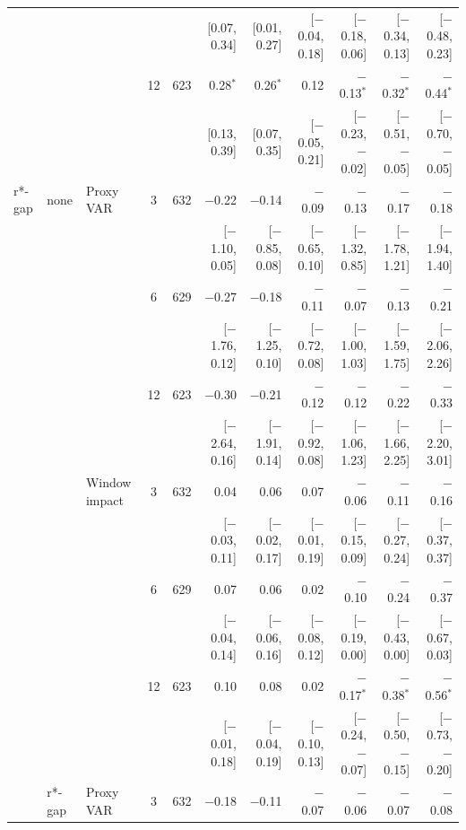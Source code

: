 \begin{longtable}{lllcrrrrrrr}
 & & & & & {\tiny [0.07, 0.34]} & {\tiny [0.01, 0.27]} & {\tiny [$-$0.04, 0.18]} & {\tiny [$-$0.18, 0.06]} & {\tiny [$-$0.34, 0.13]} & {\tiny [$-$0.48, 0.23]}\\
 &  &  & 12 & 623 & 0.28$^{*}$ & 0.26$^{*}$ & 0.12 & $-$0.13$^{*}$ & $-$0.32$^{*}$ & $-$0.44$^{*}$\\
 & & & & & {\tiny [0.13, 0.39]} & {\tiny [0.07, 0.35]} & {\tiny [$-$0.05, 0.21]} & {\tiny [$-$0.23, $-$0.02]} & {\tiny [$-$0.51, $-$0.05]} & {\tiny [$-$0.70, $-$0.05]}\\
\addlinespace
r*-gap & none & Proxy VAR & 3 & 632 & $-$0.22 & $-$0.14 & $-$0.09 & $-$0.13 & $-$0.17 & $-$0.18\\
 & & & & & {\tiny [$-$1.10, 0.05]} & {\tiny [$-$0.85, 0.08]} & {\tiny [$-$0.65, 0.10]} & {\tiny [$-$1.32, 0.85]} & {\tiny [$-$1.78, 1.21]} & {\tiny [$-$1.94, 1.40]}\\
 &  &  & 6 & 629 & $-$0.27 & $-$0.18 & $-$0.11 & $-$0.07 & $-$0.13 & $-$0.21\\
 & & & & & {\tiny [$-$1.76, 0.12]} & {\tiny [$-$1.25, 0.10]} & {\tiny [$-$0.72, 0.08]} & {\tiny [$-$1.00, 1.03]} & {\tiny [$-$1.59, 1.75]} & {\tiny [$-$2.06, 2.26]}\\
 &  &  & 12 & 623 & $-$0.30 & $-$0.21 & $-$0.12 & $-$0.12 & $-$0.22 & $-$0.33\\
 & & & & & {\tiny [$-$2.64, 0.16]} & {\tiny [$-$1.91, 0.14]} & {\tiny [$-$0.92, 0.08]} & {\tiny [$-$1.06, 1.23]} & {\tiny [$-$1.66, 2.25]} & {\tiny [$-$2.20, 3.01]}\\
 &  & Window impact & 3 & 632 & 0.04 & 0.06 & 0.07 & $-$0.06 & $-$0.11 & $-$0.16\\
 & & & & & {\tiny [$-$0.03, 0.11]} & {\tiny [$-$0.02, 0.17]} & {\tiny [$-$0.01, 0.19]} & {\tiny [$-$0.15, 0.09]} & {\tiny [$-$0.27, 0.24]} & {\tiny [$-$0.37, 0.37]}\\
 &  &  & 6 & 629 & 0.07 & 0.06 & 0.02 & $-$0.10 & $-$0.24 & $-$0.37\\
 & & & & & {\tiny [$-$0.04, 0.14]} & {\tiny [$-$0.06, 0.16]} & {\tiny [$-$0.08, 0.12]} & {\tiny [$-$0.19, 0.00]} & {\tiny [$-$0.43, 0.00]} & {\tiny [$-$0.67, 0.03]}\\
 &  &  & 12 & 623 & 0.10 & 0.08 & 0.02 & $-$0.17$^{*}$ & $-$0.38$^{*}$ & $-$0.56$^{*}$\\
 & & & & & {\tiny [$-$0.01, 0.18]} & {\tiny [$-$0.04, 0.19]} & {\tiny [$-$0.10, 0.13]} & {\tiny [$-$0.24, $-$0.07]} & {\tiny [$-$0.50, $-$0.15]} & {\tiny [$-$0.73, $-$0.20]}\\
 & r*-gap & Proxy VAR & 3 & 632 & $-$0.18 & $-$0.11 & $-$0.07 & $-$0.06 & $-$0.07 & $-$0.08\\

\end{longtable}

